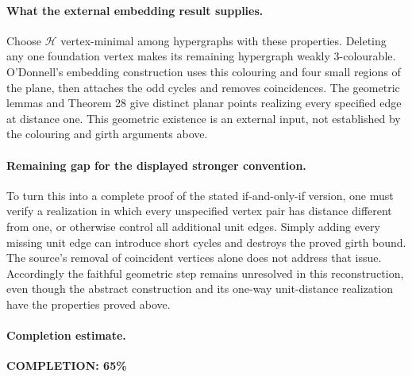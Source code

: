 \paragraph{What the external embedding result supplies.}
Choose \(\mathcal H\) vertex-minimal among hypergraphs with
these properties. Deleting any one foundation vertex makes
its remaining hypergraph weakly \(3\)-colourable.
O'Donnell's embedding construction uses this colouring and
four small regions of the plane, then attaches the odd
cycles and removes coincidences. The geometric lemmas and
Theorem 28 give distinct planar points realizing every
specified edge at distance one. This geometric existence
is an external input, not established by the colouring
and girth arguments above.

\paragraph{Remaining gap for the displayed stronger convention.}
To turn this into a complete proof of the stated
if-and-only-if version, one must verify a realization in
which every unspecified vertex pair has distance different
from one, or otherwise control all additional unit edges.
Simply adding every missing unit edge can introduce short
cycles and destroys the proved girth bound.
The source's removal of coincident vertices alone does not
address that issue. Accordingly the faithful geometric
step remains unresolved in this reconstruction, even
though the abstract construction and its one-way
unit-distance realization have the properties proved above.

\paragraph{Completion estimate.}
\textbf{COMPLETION: 65\%}
